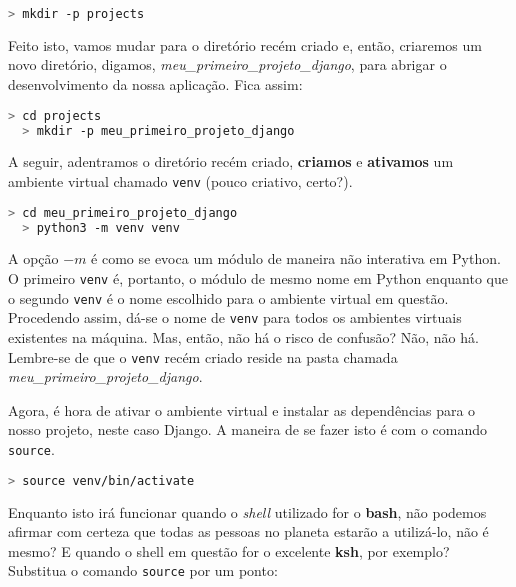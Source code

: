 \begin{lstlisting}[language=bash,caption={Criando o diretório de projetos}]
  > mkdir -p projects
\end{lstlisting}

Feito isto, vamos mudar para o diretório recém criado e, então, criaremos um
novo diretório, digamos, \textit{meu\_primeiro\_projeto\_django}, para abrigar o
desenvolvimento da nossa aplicação. Fica assim:

\begin{lstlisting}[language=bash,caption={Criando o diretório que abrigará nossa aplicação -- parte 1}]
  > cd projects
  > mkdir -p meu_primeiro_projeto_django
\end{lstlisting}

A seguir, adentramos o diretório recém criado, \textbf{criamos} e
\textbf{ativamos} um ambiente virtual chamado \texttt{venv} (pouco criativo,
certo?).

\begin{lstlisting}[language=bash,caption={Criando o diretório que abrigará nossa aplicação -- parte 2}]
  > cd meu_primeiro_projeto_django
  > python3 -m venv venv
\end{lstlisting}

A opção \(-m\) é como se evoca um módulo de maneira não interativa em Python. O
primeiro \texttt{venv} é, portanto, o módulo de mesmo nome em Python enquanto
que o segundo \texttt{venv} é o nome escolhido para o ambiente virtual em
questão. Procedendo assim, dá-se o nome de \texttt{venv} para todos os ambientes
virtuais existentes na máquina. Mas, então, não há o risco de confusão? Não, não
há. Lembre-se de que o \texttt{venv} recém criado reside na pasta chamada
\textit{meu\_primeiro\_projeto\_django}.

Agora, é hora de ativar o ambiente virtual e instalar as dependências para o
nosso projeto, neste caso Django. A maneira de se fazer isto é com o comando
\texttt{source}.

\begin{lstlisting}[language=bash,caption={Ativando o ambiente virtual -- parte 1}]
  > source venv/bin/activate
\end{lstlisting}

Enquanto isto irá funcionar quando o \textit{shell} utilizado for o
\textbf{bash}, não podemos afirmar com certeza que todas as pessoas no planeta
estarão a utilizá-lo, não é mesmo? E quando o shell em questão for o excelente
\textbf{ksh}, por exemplo? Substitua o comando \texttt{source} por um ponto:

